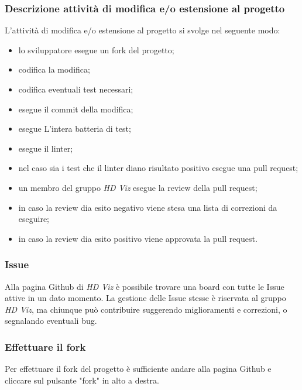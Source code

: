         \subsubsection{Descrizione attività di modifica e/o estensione al progetto}
        L'attività di modifica e/o estensione al progetto si svolge nel seguente modo:
        \begin{itemize}
            \item lo sviluppatore esegue un fork del progetto;
            \item codifica la modifica;
            \item codifica eventuali test necessari;
            \item esegue il commit della modifica;
            \item esegue L'intera batteria di test;
            \item esegue il linter;
            \item nel caso sia i test che il linter diano risultato positivo esegue una pull request;
            \item un membro del gruppo \textit{HD Viz} esegue la review della pull request;
            \item in caso la review dia esito negativo viene stesa una lista di correzioni da eseguire;
            \item in caso la review dia esito positivo viene approvata la pull request.
        \end{itemize}
        \subsubsection{Issue}
        Alla pagina Github di \textit{HD Viz} è possibile trovare una board con tutte le Issue attive in un dato momento. La gestione delle Issue stesse è riservata al gruppo \textit{HD Viz}, ma chiunque può contribuire suggerendo miglioramenti e correzioni, o segnalando eventuali bug. 
        \subsubsection{Effettuare il fork}
        Per effettuare il fork del progetto è sufficiente andare alla pagina Github e cliccare sul pulsante "fork" in alto a destra.
